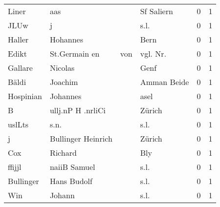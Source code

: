 \documentclass[10pt,a4paper,landscape]{article}
\begin{document}
\begin{longtable}{llllrr}
                    Liner &                                aas &             &                                  Sf Saliern &          0 &         1 \\
                     JLUw &                                  j &             &                                        s.l. &          0 &         1 \\
                   Haller &                           Hohannes &             &                                        Bern &          0 &         1 \\
                    Edikt &                      St.Germain en &         von &                                   vgl. Nr.  &          0 &         1 \\
                  Gallare &                            Nicolas &             &                                        Genf &          0 &         1 \\
                    Bäldi &                            Joachim &             &                                 Amman Beide &          0 &         1 \\
                Hospinian &                           Johannes &             &                                        asel &          0 &         1 \\
                        B &                  ullj.nP H .nrliCi &             &                                      Zürich &          0 &         1 \\
                   uslLts &                               s.n. &             &                                        s.l. &          0 &         1 \\
                        j &                 Bullinger Heinrich &             &                                      Zürich &          0 &         1 \\
                      Cox &                            Richard &             &                                         Bly &          0 &         1 \\
                   ffijjl &                       naiiB Samuel &             &                                        s.l. &          0 &         1 \\
                Bullinger &                        Hans Budolf &             &                                        s.l. &          0 &         1 \\
                      Win &                             Johann &             &                                        s.l. &          0 &         1 \\

\end{longtable}
\end{document}
